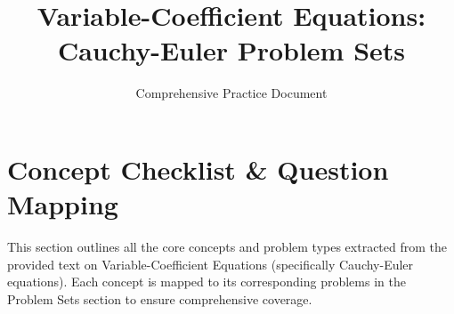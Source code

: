 \documentclass[11pt]{article}
\title{Variable-Coefficient Equations: Cauchy-Euler Problem Sets}
\author{Comprehensive Practice Document}
\date{}
\begin{document}
\maketitle

\tableofcontents
\newpage

\section{Concept Checklist \& Question Mapping}
\label{sec:mapping_start}
This section outlines all the core concepts and problem types extracted from the provided text on Variable-Coefficient Equations (specifically Cauchy-Euler equations). Each concept is mapped to its corresponding problems in the Problem Sets section to ensure comprehensive coverage.
\end{document}
